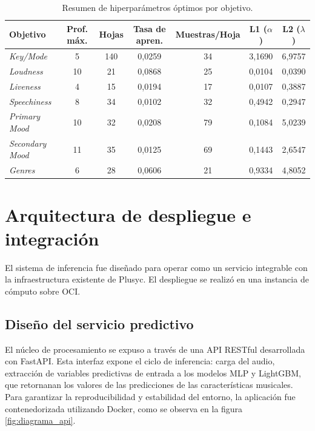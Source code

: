 \begin{table}[htpb]
\centering
\caption{Resumen de hiperparámetros óptimos por objetivo.}
\label{tab:hiperparametros_lgbm}
\renewcommand{\arraystretch}{1.2}
\small
\begin{tabular}{@{}l c c c c c c@{}}
\toprule
\textbf{Objetivo} & \textbf{Prof. máx.} & \textbf{Hojas} & \textbf{Tasa de apren.} & \textbf{Muestras/Hoja} & \textbf{L1} ($\alpha$) & \textbf{L2} ($\lambda$) \\
\midrule
\textit{Key/Mode}      & 5  & 140 & 0,0259 & 34 & 3,1690 & 6,9757 \\
\textit{Loudness}      & 10 & 21  & 0,0868 & 25 & 0,0104 & 0,0390 \\
\textit{Liveness}      & 4  & 15  & 0,0194 & 17 & 0,0107 & 0,3887 \\
\textit{Speechiness}   & 8  & 34  & 0,0102 & 32 & 0,4942 & 0,2947 \\
\textit{Primary Mood}  & 10 & 32  & 0,0208 & 79 & 0,1084 & 5,0239 \\
\textit{Secondary Mood}& 11 & 35  & 0,0125 & 69 & 0,1443 & 2,6547 \\
\textit{Genres}        & 6  & 28  & 0,0606 & 21 & 0,9334 & 4,8052 \\
\bottomrule
\end{tabular}
\end{table}

\section{Arquitectura de despliegue e integración}
\label{sec:arquitectura_despliegue}



El sistema de inferencia fue diseñado para operar como un servicio integrable con la infraestructura existente de Plusyc. El despliegue se realizó en una instancia de cómputo sobre OCI.

\subsection{Diseño del servicio predictivo}
El núcleo de procesamiento se expuso a través de una API RESTful desarrollada con FastAPI. Esta interfaz expone el ciclo de inferencia: carga del audio, extracción de variables predictivas de entrada a los modelos MLP y LightGBM, que retornanan los valores de las predicciones de las características musicales.
Para garantizar la reproducibilidad y estabilidad del entorno, la aplicación fue contenedorizada utilizando Docker, como se observa en la figura \ref{fig:diagrama_api}.

